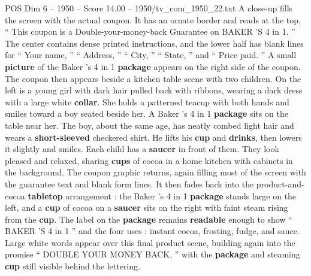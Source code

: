 \begin{textsample}{POS Dim 6 – 1950 – Score 14.00 – 1950/tv\_com\_1950\_22.txt}
A close-up fills the screen with the actual coupon.
It has an ornate border and reads at the top, “ This coupon is a Double-your-money-back Guarantee on BAKER ’S 4 in 1. ” The center contains dense printed instructions, and the lower half has blank lines for “ Your name, ” “ Address, ” “ City, ” “ State, ” and “ Price paid. ” A small \textbf{picture} of the Baker ’s 4 in 1 \textbf{package} appears on the right side of the coupon.
The coupon then appears beside a kitchen table scene with two children.
On the left is a young girl with dark hair pulled back with ribbons, wearing a dark dress with a large white \textbf{collar}.
She holds a patterned teacup with both hands and smiles toward a boy seated beside her.
A Baker ’s 4 in 1 \textbf{package} sits on the table near her.
The boy, about the same age, has neatly combed light hair and wears a \textbf{short-sleeved} checkered shirt.
He lifts his \textbf{cup} and \textbf{drinks}, then lowers it slightly and smiles.
Each child has a \textbf{saucer} in front of them.
They look pleased and relaxed, sharing \textbf{cups} of cocoa in a home kitchen with cabinets in the background.
The coupon graphic returns, again filling most of the screen with the guarantee text and blank form lines.
It then fades back into the product-and-cocoa \textbf{tabletop} arrangement : the Baker ’s 4 in 1 \textbf{package} stands large on the left, and a \textbf{cup} of cocoa on a \textbf{saucer} sits on the right with faint steam rising from the \textbf{cup}.
The label on the \textbf{package} remains \textbf{readable} enough to show “ BAKER ’S 4 in 1 ” and the four uses : instant cocoa, frosting, fudge, and sauce.
Large white words appear over this final product scene, building again into the promise “ DOUBLE YOUR MONEY BACK, ” with the \textbf{package} and steaming \textbf{cup} still visible behind the lettering.

\end{textsample}
